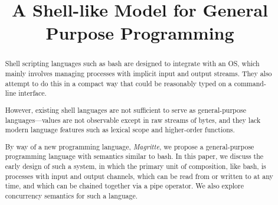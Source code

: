 \ifsigpro{ \documentclass[english,PRO]{ipsj} }
\begin{document}
\title{A Shell-like Model for General Purpose Programming}





\begin{abstract}
Shell scripting languages such as bash are designed to integrate with an OS, which mainly involves managing processes with implicit input and output streams. They also attempt to do this in a compact way that could be reasonably typed on a command-line interface.

However, existing shell languages are not sufficient to serve as general-purpose languages---values are not observable except in raw streams of bytes, and they lack modern language features such as lexical scope and higher-order functions.

By way of a new programming language, \emph{Magritte}, we propose a general-purpose programming language with semantics similar to bash. In this paper, we discuss the early design of such a system, in which the primary unit of composition, like bash, is processes with input and output channels, which can be read from or written to at any time, and which can be chained together via a pipe operator. We also explore concurrency semantics for such a language.
\end{abstract}
\end{document}
